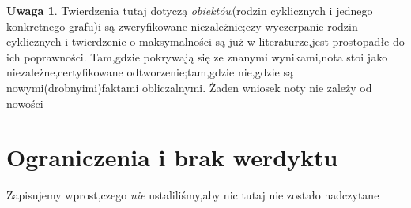 \documentclass[11pt]{article}
\theoremstyle{definition}
\newtheorem{remark}[theorem]{Uwaga}
\theoremstyle{plain}
\begin{document}
\begin{remark}
Twierdzenia tutaj dotyczą \emph{obiektów}(rodzin cyklicznych i jednego konkretnego grafu)i są zweryfikowane niezależnie;czy wyczerpanie rodzin cyklicznych i twierdzenie o maksymalności są już w literaturze,jest prostopadłe do ich poprawności. Tam,gdzie pokrywają się ze znanymi wynikami,nota stoi jako niezależne,certyfikowane odtworzenie;tam,gdzie nie,gdzie są nowymi(drobnyimi)faktami obliczalnymi. Żaden wniosek noty nie zależy od nowości\end{remark}

\section{Ograniczenia i brak werdyktu}\label{sec:limits}

Zapisujemy wprost,czego \emph{nie} ustaliliśmy,aby nic tutaj nie zostało nadczytane
\end{document}
